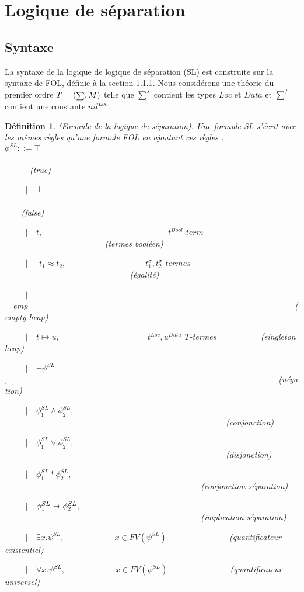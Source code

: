\documentclass[9pt,openany]{book}
\newcommand\sepimp{\mathrel{-\mkern-6mu*}}
\newtheorem{definition}{D\'efinition}[section]
\begin{document}
	\section{Logique de s\'eparation}
		\subsection{Syntaxe}
	La syntaxe de la logique de logique de s\'eparation (SL) est construite sur la syntaxe de FOL, d\'efinie \`a la section 1.1.1. Nous consid\'erons une th\'eorie du premier ordre $T=(\mathsmaller\sum,M)$ telle que $\sum^{s}$ contient les types $Loc$ et $Data$ et $\sum^{f}$ contient une constante $nil^{Loc}$.
	\begin{definition}
	(Formule de la logique de s\'eparation). Une formule SL s'\'ecrit avec les m\^emes r\`egles qu'une formule FOL en ajoutant ces r\`egles :
	\\$\phi^{SL} ::= \top$~~~~~~~~~~~~~~~~~~~~~~~~~~~~~~~~~~~~~~~~~~~~~~~~~~~~~~~~~~~~~~~~~~~~~~~~~~~~(true)\par
~~~~~$|$~~$\bot$~~~~~~~~~~~~~~~~~~~~~~~~~~~~~~~~~~~~~~~~~~~~~~~~~~~~~~~~~~~~~~~~~~~~~~~~~~(false)
\par
~~~~~$|$~~$t,$~~~~~~~~~~~~~~~~~~~~~~~~~~~~~~$t^{Bool}$ $term$~~~~~~~~~~~~~~~~~~~~~~~~(termes bool\'een)\par
~~~~~$|$~~ $t_{1} \approx t_{2},$~~~~~~~~~~~~~~~~~~~$t_{1}^{\sigma},t_{2}^{\sigma}$ $termes$~~~~~~~~~~~~~~~~~~~~~~~~~~~~~~(\'egalit\'e)\par
~~~~~$|$~~emp~~~~~~~~~~~~~~~~~~~~~~~~~~~~~~~~~~~~~~~~~~~~~~~~~~~~~~~~~~~~~~~~(empty heap)\par
~~~~~$|$~~$t\mapsto u,$~~~~~~~~~~~~~~~~~~~~~$t^{Loc},u^{Data}$ $T$-termes ~~~~~~~~~~(singleton heap)\par 
~~~~~$|$~~$\neg\psi^{SL}$,~~~~~~~~~~~~~~~~~~~~~~~~~~~~~~~~~~~~~~~~~~~~~~~~~~~~~~~~~~~~~~~~~(n\'egation)\par
~~~~~$|$~~$\phi_{1}^{SL} \land \phi_{2}^{SL},$~~~~~~~~~~~~~~~~~~~~~~~~~~~~~~~~~~~~~~~~~~~~~~~~~~~~~(conjonction)\par
~~~~~$|$~~$\phi_{1}^{SL} \lor \phi_{2}^{SL},$~~~~~~~~~~~~~~~~~~~~~~~~~~~~~~~~~~~~~~~~~~~~~~~~~~~~~(disjonction)\par
~~~~~$|$~~$\phi_{1}^{SL} * \phi_{2}^{SL},$~~~~~~~~~~~~~~~~~~~~~~~~~~~~~~~~~~~~~~~~~~~~~~~(conjonction s\'eparation)\par
~~~~~$|$~~$\phi_{1}^{SL} \sepimp \phi_{2}^{SL},$~~~~~~~~~~~~~~~~~~~~~~~~~~~~~~~~~~~~~~~~~~~~~~~(implication s\'eparation)\par
~~~~~$|$~~$\exists x.\psi^{SL},$~~~~~~~~~~~~$x\in FV(\psi^{SL})$~~~~~~~~~~~~~~~(quantificateur existentiel)\par
~~~~~$|$~~$\forall x.\psi^{SL},$~~~~~~~~~~~~$x\in FV(\psi^{SL})$~~~~~~~~~~~~~~~(quantificateur universel)
	\end{definition}
\end{document}
